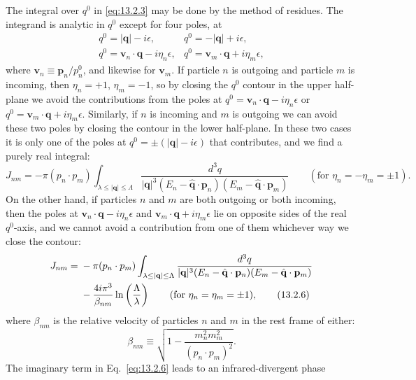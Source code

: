 The integral over $q^0$ in \eqref{eq:13.2.3} may be done by the method of residues.
The integrand is analytic in $q^0$ except for four poles, at
\[
  \begin{array}{ll}
    q^0=|\mathbf q|-i\epsilon, & q^0=-|\mathbf q|+i\epsilon,\\
    q^0=\mathbf v_n\cdot\mathbf q-i\eta_n\epsilon,
      & q^0=\mathbf v_m\cdot\mathbf q+i\eta_m\epsilon,
  \end{array}
\]
where $\mathbf v_n\equiv\mathbf p_n/p_n^0$, and likewise for $\mathbf v_m$. If particle $n$ is outgoing and
particle $m$ is incoming, then $\eta_n=+1$, $\eta_m=-1$, so by closing the $q^0$
contour in the upper half-plane we avoid the contributions from the poles
at $q^0=\mathbf v_n\cdot\mathbf q-i\eta_n\epsilon$ or $q^0=\mathbf v_m\cdot\mathbf q+i\eta_m\epsilon$. Similarly, if $n$ is incoming and $m$ is
outgoing we can avoid these two poles by closing the contour in the lower
half-plane. In these two cases it is only one of the poles at $q^0=\pm(|\mathbf q|-i\epsilon)$
that contributes, and we find a purely real integral:
\begin{equation}
  J_{nm}=-\pi(p_n\cdot p_m)
  \int_{\lambda\leq|\mathbf q|\leq\Lambda}
  \frac{d^3q}{|\mathbf q|^3
  (E_n-\hat{\mathbf q}\cdot\mathbf p_n)(E_m-\hat{\mathbf q}\cdot\mathbf p_m)}
  \qquad(\text{for }\eta_n=-\eta_m=\pm1).
  \tag{13.2.5}\label{eq:13.2.5}
\end{equation}
On the other hand, if particles $n$ and $m$ are both outgoing or both
incoming, then the poles at $\mathbf v_n\cdot\mathbf q-i\eta_n\epsilon$ and $\mathbf v_m\cdot\mathbf q+i\eta_m\epsilon$ lie on opposite
sides of the real $q^0$-axis, and we cannot avoid a contribution from one of
them whichever way we close the contour:
\begin{align}
  J_{nm}={}&-\pi(p_n\cdot p_m)
  \int_{\lambda\leq|\mathbf q|\leq\Lambda}
  \frac{d^3q}{|\mathbf q|^3
  (E_n-\hat{\mathbf q}\cdot\mathbf p_n)(E_m-\hat{\mathbf q}\cdot\mathbf p_m)}
  \notag\\
  &-\frac{4i\pi^3}{\beta_{nm}}\ln\left(\frac{\Lambda}{\lambda}\right)
  \qquad(\text{for }\eta_n=\eta_m=\pm1),
  \tag{13.2.6}\label{eq:13.2.6}
\end{align}
where $\beta_{nm}$ is the relative velocity of particles $n$ and $m$ in the rest frame of
either:
\begin{equation}
  \beta_{nm}\equiv\sqrt{1-\frac{m_n^2m_m^2}{(p_n\cdot p_m)^2}}.
  \tag{13.2.7}\label{eq:13.2.7}
\end{equation}
The imaginary term in Eq.~\eqref{eq:13.2.6} leads to an infrared-divergent phase
